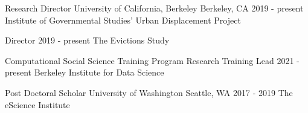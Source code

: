 

\begin{cventries}



  \cventry
    {Research Director} %
    {University of California, Berkeley} %
    {Berkeley, CA} %
    {2019 - present} %
    {Institute of Governmental Studies' Urban Displacement Project}

  \cventry
    {Director} %
    {} %
    {} %
    {2019 - present} %
    {The Evictions Study}    

  \cventry
    {Computational Social Science Training Program Research Training Lead} %
    {} %
    {} %
    {2021 - present} %
    {Berkeley Institute for Data Science\newline}

  \cventry
    {Post Doctoral Scholar} %
    {University of Washington} %
    {Seattle, WA} %
    {2017 - 2019} %
    {The eScience Institute}

\end{cventries}